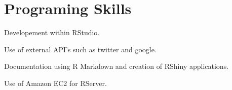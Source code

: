 \documentclass[letterpaper]{deedy-resume} %
\begin{document}
%



\section{Programing Skills} 

\vspace{\topsep}
\vspace{\topsep}
\begin{tightitemize}
    \item  Developement within RStudio.
    \item  Use of external API's such as twitter and google.
    \item Documentation using R Markdown and creation of RShiny applications.
    \item Use of Amazon EC2 for RServer.
  \end{tightitemize}
\end{document}
